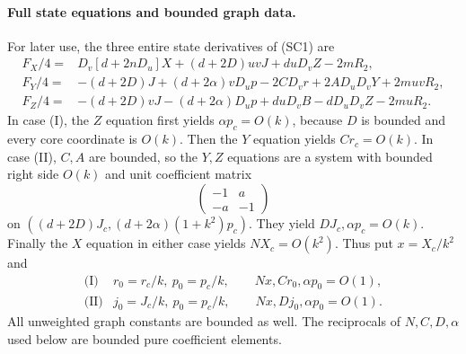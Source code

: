 \paragraph{Full state equations and bounded graph data.}
For later use, the three entire state derivatives of (SC1) are
\[
\begin{split}
 F_X/4={}&D_v[d+2nD_u]X+(d+2D)uvJ+d uD_vZ-2mR_2,\\
 F_Y/4={}&-(d+2D)J+(d+2\alpha)vD_up-2CD_vr
                  +2AD_uD_vY+2muvR_2,\\
 F_Z/4={}&-(d+2D)vJ-(d+2\alpha)D_up+d uD_vB
                  -dD_uD_vZ-2muR_2.                
\end{split}\tag{SC7}
\]
In case (I), the $Z$ equation first yields $\alpha p_c=O(k)$,
because $D$ is bounded and every core coordinate is $O(k)$.
Then the $Y$ equation yields $Cr_c=O(k)$. In case (II), $C,A$
are bounded, so the $Y,Z$ equations are a system with bounded right
side $O(k)$ and unit coefficient matrix
\[
 \begin{pmatrix}-1&a\\-a&-1\end{pmatrix}
\]
on $((d+2D)J_c,(d+2\alpha)(1+k^2)p_c)$.
They yield $DJ_c,\alpha p_c=O(k)$. Finally the $X$ equation in
either case yields $NX_c=O(k^2)$. Thus put $x=X_c/k^2$ and
\[
\begin{array}{ll}
 \text{(I)}&r_0=r_c/k,\ p_0=p_c/k,
       \qquad Nx,Cr_0,\alpha p_0=O(1),\\
 \text{(II)}&j_0=J_c/k,\ p_0=p_c/k,
       \qquad Nx,Dj_0,\alpha p_0=O(1).
\end{array}                                                    \tag{SC8}
\]
All unweighted graph constants are bounded as well. The reciprocals
of $N,C,D,\alpha$ used below are bounded pure coefficient elements.

